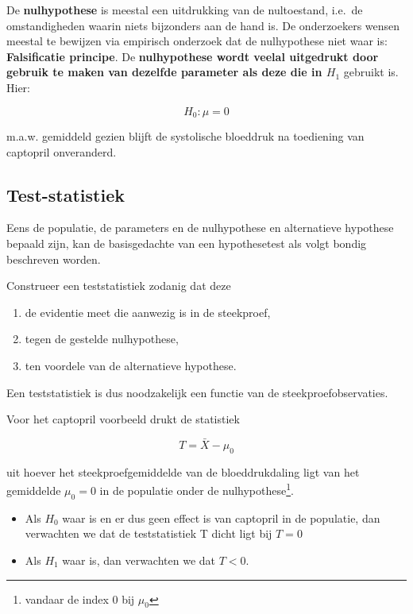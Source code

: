 \documentclass[
  12pt,dutch,coursenotes]{book}
\providecommand{\tightlist}{%
  \setlength{\itemsep}{0pt}\setlength{\parskip}{0pt}}
\theoremstyle{definition}
\theoremstyle{definition}
\theoremstyle{definition}
\theoremstyle{remark}
\begin{document}
De \textbf{nulhypothese} is meestal een uitdrukking van de nultoestand, i.e.~de omstandigheden waarin niets bijzonders aan de hand is.
De onderzoekers wensen meestal te bewijzen via empirisch onderzoek dat de nulhypothese niet waar is:
\textbf{Falsificatie principe}.
De \textbf{nulhypothese wordt veelal uitgedrukt door gebruik te maken van dezelfde parameter als deze die in \(H_1\)} gebruikt is. Hier:

\[H_0 : \mu=0\]

m.a.w. gemiddeld gezien blijft de systolische bloeddruk na toediening van captopril onveranderd.

\hypertarget{test-statistiek}{%
\subsection{Test-statistiek}\label{test-statistiek}}

Eens de populatie, de parameters en de nulhypothese en alternatieve hypothese bepaald zijn, kan de basisgedachte van een hypothesetest als volgt bondig beschreven worden.

Construeer een teststatistiek zodanig dat deze

\begin{enumerate}
\def\labelenumi{\arabic{enumi}.}
\tightlist
\item
  de evidentie meet die aanwezig is in de steekproef,
\item
  tegen de gestelde nulhypothese,
\item
  ten voordele van de alternatieve hypothese.
\end{enumerate}

Een teststatistiek is dus noodzakelijk een functie van de steekproefobservaties.

Voor het captopril voorbeeld drukt de statistiek

\[T=\bar X - \mu_0\]

uit hoever het steekproefgemiddelde van de bloeddrukdaling ligt van het gemiddelde \(\mu_0=0\) in de populatie onder de nulhypothese\footnote{vandaar de index 0 bij \(\mu_0\)}.

\begin{itemize}
\tightlist
\item
  Als \(H_0\) waar is en er dus geen effect is van captopril in de populatie, dan verwachten we dat de teststatistiek T dicht ligt bij \(T=0\)
\item
  Als \(H_1\) waar is, dan verwachten we dat \(T<0\).
\end{itemize}
\end{document}
